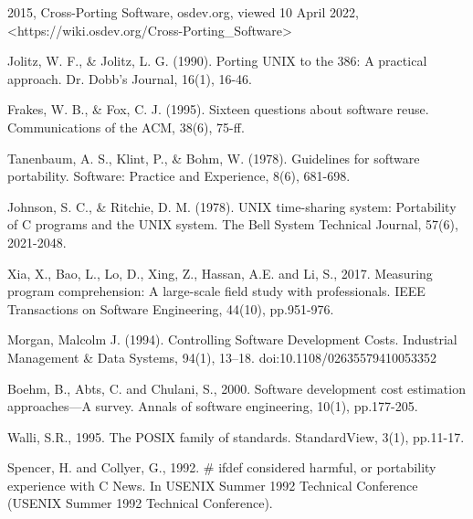 \begin{flushleft}
\begin{thebibliography}{99}
    2015,
    Cross-Porting Software,
    osdev.org,
    viewed 10 April 2022,
    <https://wiki.osdev.org/Cross-Porting\_Software>

    Jolitz, W. F., \& Jolitz, L. G. (1990).
    Porting UNIX to the 386: A practical approach.
    Dr. Dobb's Journal, 16(1), 16-46.

    Frakes, W. B., \& Fox, C. J. (1995).
    Sixteen questions about software reuse.
    Communications of the ACM, 38(6), 75-ff.

    Tanenbaum, A. S., Klint, P., \& Bohm, W. (1978).
    Guidelines for software portability.
    Software: Practice and Experience, 8(6), 681-698.

    Johnson, S. C., \& Ritchie, D. M. (1978).
    UNIX time-sharing system: Portability of C programs and the UNIX system.
    The Bell System Technical Journal, 57(6), 2021-2048.

    Xia, X., Bao, L., Lo, D., Xing, Z., Hassan, A.E. and Li, S., 2017.
    Measuring program comprehension: A large-scale field study with professionals.
    IEEE Transactions on Software Engineering, 44(10), pp.951-976.

    Morgan, Malcolm J. (1994).
    Controlling Software Development Costs.
    Industrial Management \& Data Systems, 94(1), 13–18. doi:10.1108/02635579410053352

    Boehm, B., Abts, C. and Chulani, S., 2000.
    Software development cost estimation approaches—A survey.
    Annals of software engineering, 10(1), pp.177-205.

    Walli, S.R., 1995.
    The POSIX family of standards. StandardView, 3(1), pp.11-17.

    Spencer, H. and Collyer, G., 1992.
    \# ifdef considered harmful, or portability experience with C News.
    In USENIX Summer 1992 Technical Conference (USENIX Summer 1992 Technical Conference).

    \end{thebibliography}
\end{flushleft}
